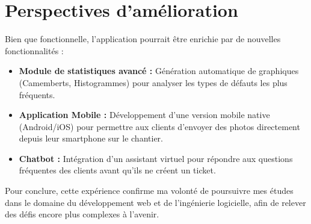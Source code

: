 \section*{Perspectives d'amélioration}
Bien que fonctionnelle, l'application pourrait être enrichie par de nouvelles fonctionnalités :
\begin{itemize}
    \item \textbf{Module de statistiques avancé :} Génération automatique de graphiques (Camemberts, Histogrammes) pour analyser les types de défauts les plus fréquents.
    \item \textbf{Application Mobile :} Développement d'une version mobile native (Android/iOS) pour permettre aux clients d'envoyer des photos directement depuis leur smartphone sur le chantier.
    \item \textbf{Chatbot :} Intégration d'un assistant virtuel pour répondre aux questions fréquentes des clients avant qu'ils ne créent un ticket.
\end{itemize}

Pour conclure, cette expérience confirme ma volonté de poursuivre mes études dans le domaine du développement web et de l'ingénierie logicielle, afin de relever des défis encore plus complexes à l'avenir.
